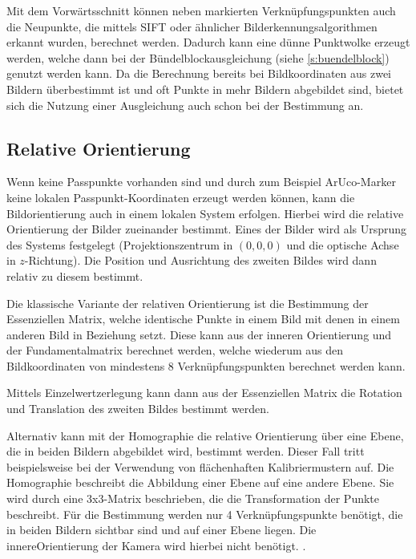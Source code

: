 \documentclass[./00PhotoBox.tex]{subfiles}
\begin{document}
Mit dem Vorwärts\-schnitt können neben markierten Verknüpfungspunkten auch die Neupunkte, die mittels SIFT oder ähnlicher Bild\-erkennungs\-algorithmen erkannt wurden, berechnet werden. Dadurch kann eine dünne Punktwolke erzeugt werden, welche dann bei der Bündelblockausgleichung (siehe \autoref{s:buendelblock}) genutzt werden kann. Da die Berechnung bereits bei Bildkoordinaten aus zwei Bildern überbestimmt ist und oft Punkte in mehr Bildern abgebildet sind, bietet sich die Nutzung einer Ausgleichung auch schon bei der Bestimmung an. \citep[vgl.][S. 385]{luhmann}

\subsection{Relative Orientierung}
\label{ss:relative_orientierung}
Wenn keine Passpunkte vorhanden sind und durch zum Beispiel ArUco-Marker keine lokalen Passpunkt-Koordinaten erzeugt werden können, kann die Bildorientierung auch in einem lokalen System erfolgen. Hierbei wird die relative Orientierung der Bilder zueinander bestimmt. Eines der Bilder wird als Ursprung des Systems festgelegt (Projektionszentrum in $(0,0,0)$ und die optische Achse in $z$-Richtung). Die Position und Ausrichtung des zweiten Bildes wird dann relativ zu diesem bestimmt. \citep[vgl.][S. 316]{luhmann}

Die klassische Variante der relativen Orientierung ist die Bestimmung der Essenziellen Matrix, welche identische Punkte in einem Bild mit denen in einem anderen Bild in Beziehung setzt. Diese kann aus der inneren Orientierung und der Fundamentalmatrix berechnet werden, welche wiederum aus den Bildkoordinaten von mindestens 8 Verknüpfungspunkten berechnet werden kann. \citep[vgl.][S. 328ff]{luhmann}

Mittels Einzelwertzerlegung kann dann aus der Essenziellen Matrix die Rotation und Translation des zweiten Bildes bestimmt werden. \citep[vgl.][S. 275]{hartley}

Alternativ kann mit der Homographie die relative Orientierung über eine Ebene, die in beiden Bildern abgebildet wird, bestimmt werden. Dieser Fall tritt beispielsweise bei der Verwendung von flächenhaften Kalibriermustern auf. Die Homographie beschreibt die Abbildung einer Ebene auf eine andere Ebene. Sie wird durch eine 3x3-Matrix beschrieben, die die Transformation der Punkte beschreibt. Für die Bestimmung werden nur 4 Verknüpfungspunkte benötigt, die in beiden Bildern sichtbar sind und auf einer Ebene liegen. Die \gls{innereOrientierung} der Kamera wird hierbei nicht benötigt. \citep[vgl.][S. 33ff]{hartley}.
\end{document}
